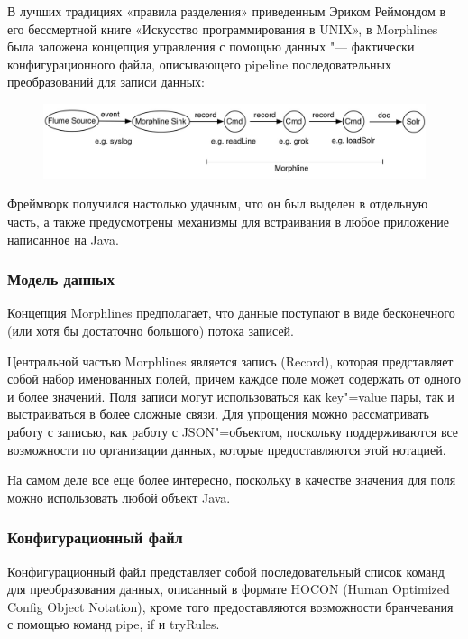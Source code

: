 \documentclass[10pt, a5paper]{article}
\begin{document}
В лучших традициях «правила разделения» приведенным Эриком Реймондом в его бессмертной книге «Искусство программирования в UNIX», в Morphlines была заложена концепция управления с помощью данных "--- фактически конфигурационного файла, описывающего pipeline последовательных преобразований для записи данных:

\begin{figure}[h!]
  \centering
  \includegraphics[scale=0.5]{21_2014_morphlines.jpg}
\end{figure}

Фреймворк получился настолько удачным, что он был выделен в отдельную часть, а также предусмотрены механизмы для встраивания в любое приложение написанное на Java.

\subsubsection*{Модель данных}

Концепция Morphlines предполагает, что данные поступают в виде бесконечного (или хотя бы достаточно большого) потока записей.

Центральной частью Morphlines является запись (Record), которая представляет собой набор именованных полей, причем каждое поле может содержать от одного и более значений. Поля записи могут использоваться как key"=value пары, так и выстраиваться в более сложные связи. Для упрощения можно рассматривать работу с записью, как работу с JSON"=объектом, поскольку поддерживаются все возможности по организации данных, которые предоставляются этой нотацией.

На самом деле все еще более интересно, поскольку в качестве значения для поля можно использовать любой объект Java.

\subsubsection*{Конфигурационный файл}

Конфигурационный файл представляет собой последовательный список команд для преобразования данных, описанный в формате HOCON (Human Optimized Config Object Notation), кроме того предоставляются возможности бранчевания с помощью команд pipe, if и tryRules.
\end{document}
